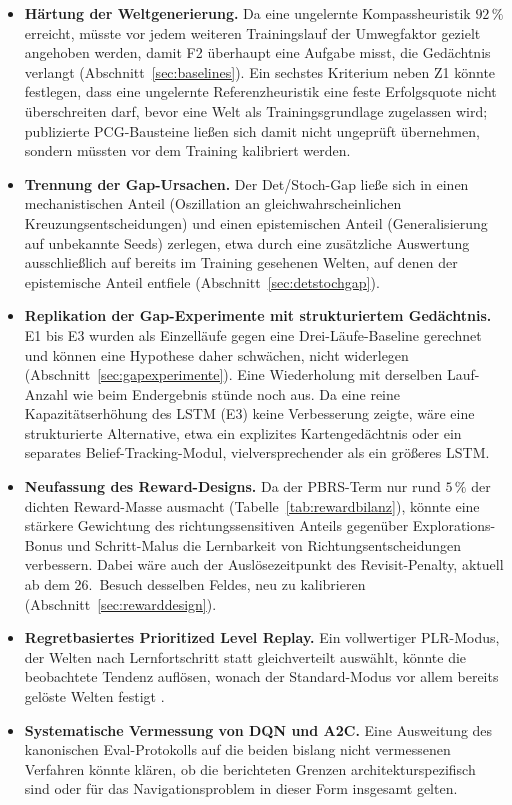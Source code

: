 \documentclass[11pt,a4paper]{article}
\begin{document}
\begin{itemize}
  \item \textbf{Härtung der Weltgenerierung.} Da eine ungelernte
        Kompassheuristik $92\,\%$ erreicht, müsste vor jedem weiteren
        Trainingslauf der Umwegfaktor gezielt angehoben werden, damit F2
        überhaupt eine Aufgabe misst, die Gedächtnis verlangt
        (Abschnitt~\ref{sec:baselines}). Ein sechstes Kriterium neben Z1
        könnte festlegen, dass eine ungelernte Referenzheuristik eine feste
        Erfolgsquote nicht überschreiten darf, bevor eine Welt als
        Trainingsgrundlage zugelassen wird; publizierte
        PCG-Bausteine ließen sich damit nicht ungeprüft übernehmen, sondern
        müssten vor dem Training kalibriert werden.
  \item \textbf{Trennung der Gap-Ursachen.} Der Det/Stoch-Gap ließe sich in
        einen mechanistischen Anteil (Oszillation an gleichwahrscheinlichen
        Kreuzungsentscheidungen) und einen epistemischen Anteil
        (Generalisierung auf unbekannte Seeds) zerlegen, etwa durch eine
        zusätzliche Auswertung ausschließlich auf bereits im Training
        gesehenen Welten, auf denen der epistemische Anteil entfiele
        (Abschnitt~\ref{sec:detstochgap}).
  \item \textbf{Replikation der Gap-Experimente mit strukturiertem
        Gedächtnis.} E1 bis E3 wurden als Einzelläufe gegen eine
        Drei-Läufe-Baseline gerechnet und können eine Hypothese daher
        schwächen, nicht widerlegen (Abschnitt~\ref{sec:gapexperimente}).
        Eine Wiederholung mit derselben Lauf-Anzahl wie beim Endergebnis
        stünde noch aus. Da eine reine Kapazitätserhöhung des LSTM (E3)
        keine Verbesserung zeigte, wäre eine strukturierte Alternative, etwa
        ein explizites Kartengedächtnis oder ein separates
        Belief-Tracking-Modul, vielversprechender als ein größeres LSTM.
  \item \textbf{Neufassung des Reward-Designs.} Da der PBRS-Term nur rund
        $5\,\%$ der dichten Reward-Masse ausmacht (Tabelle~\ref{tab:rewardbilanz}),
        könnte eine stärkere Gewichtung des richtungssensitiven Anteils
        gegenüber Explorations-Bonus und Schritt-Malus die Lernbarkeit von
        Richtungsentscheidungen verbessern. Dabei wäre auch der
        Auslösezeitpunkt des Revisit-Penalty, aktuell ab dem 26.\ Besuch
        desselben Feldes, neu zu kalibrieren (Abschnitt~\ref{sec:rewarddesign}).
  \item \textbf{Regretbasiertes Prioritized Level Replay.} Ein vollwertiger
        PLR-Modus, der Welten nach Lernfortschritt statt gleichverteilt
        auswählt, könnte die beobachtete Tendenz auflösen, wonach der
        Standard-Modus vor allem bereits gelöste Welten festigt
        \cite{jiang2021plr}.
  \item \textbf{Systematische Vermessung von DQN und A2C.} Eine Ausweitung
        des kanonischen Eval-Protokolls auf die beiden bislang nicht
        vermessenen Verfahren könnte klären, ob die berichteten Grenzen
        architekturspezifisch sind oder für das Navigationsproblem in
        dieser Form insgesamt gelten.
\end{itemize}
\end{document}
